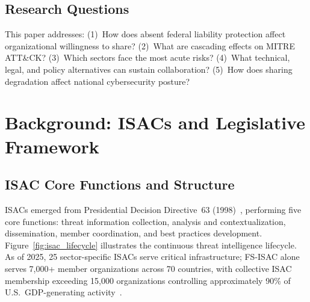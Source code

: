 \documentclass[journal]{IEEEtran}
\begin{document}
\subsection{Research Questions}

This paper addresses: (1)~How does absent federal liability protection affect organizational willingness to share? (2)~What are cascading effects on MITRE ATT\&CK? (3)~Which sectors face the most acute risks? (4)~What technical, legal, and policy alternatives can sustain collaboration? (5)~How does sharing degradation affect national cybersecurity posture?

\section{Background: ISACs and Legislative Framework}

\subsection{ISAC Core Functions and Structure}

ISACs emerged from Presidential Decision Directive~63 (1998)~\cite{clinton1998pdd63}, performing five core functions: threat information collection, analysis and contextualization, dissemination, member coordination, and best practices development. Figure~\ref{fig:isac_lifecycle} illustrates the continuous threat intelligence lifecycle. As of 2025, 25 sector-specific ISACs serve critical infrastructure; FS-ISAC alone serves 7,000+ member organizations across 70 countries, with collective ISAC membership exceeding 15,000 organizations controlling approximately 90\% of U.S.\ GDP-generating activity~\cite{nationalisacs2025,fsisac2025annual}.
\end{document}
